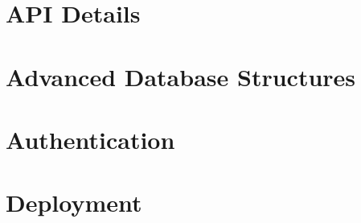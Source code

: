 \documentclass[b5paper,openany]{book}
\begin{document}
\chapter{API Details}


\chapter{Advanced Database Structures}

\pagebreak


\chapter{Authentication}


\chapter{Deployment}






\end{document}
